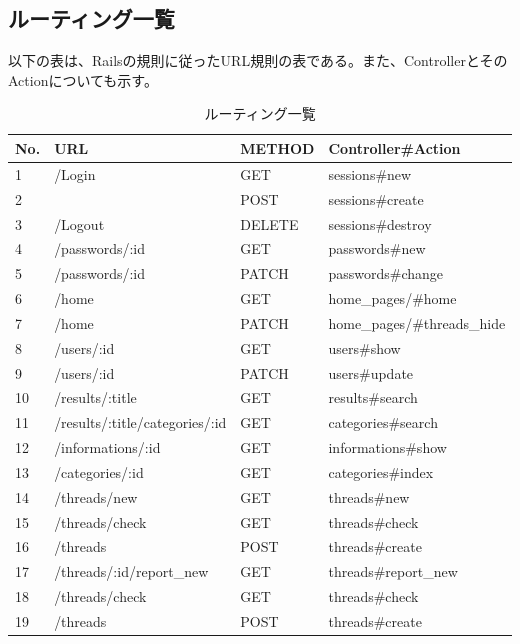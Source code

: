\documentclass[a4j]{jarticle}
\begin{document}
\subsection{ルーティング一覧}
以下の表は、Railsの規則に従ったURL規則の表である。また、ControllerとそのActionについても示す。



\begin{table}[htb]
  \caption{ルーティング一覧}
  \centering
  \begin{tabular}{|l|l|l||l|} \hline
    No.&   URL 						&METHOD & Controller\#Action \\ \hline \hline
	 1&	/Login  					 	& GET      & sessions\#new       \\
       2&  ~			         			& POST    & sessions\#create	\\
	 3&	/Logout   				      &DELETE   &sessions\#destroy	\\
	 4&	/passwords/:id					&GET	  &passwords\#new    \\
	 5 & /passwords/:id					&PATCH	  &passwords\#change \\
	 6&	/home   						& GET 	   &home\_pages/\#home    \\
       7&	/home   						& PATCH 	   &home\_pages/\#threads\_hide \\
	 8&	/users/:id     					&  GET  	    &  users\#show       \\
	 9&	/users/:id     					 & PATCH   &  users\#update       \\
	10&	/results/:title         			& GET   	    & results\#search      \\
	11& /results/:title/categories/:id		&GET		& categories\#search	\\
	12&	/informations/:id				  & GET       & informations\#show      \\
	13&	/categories/:id    		   		 &   GET      & categories\#index    \\
	14&	/threads/new      	 	  		 &  GET      &  threads\#new         \\
	15&/threads/check      		       &  GET      & threads\#check       \\
	16&/threads                   		       &  POST    &threads\#create      \\
	17&/threads/:id/report\_new   		&   GET      &threads\#report\_new  \\
	18&	/threads/check               		&   GET      & threads\#check       \\
	19&	/threads                      		 & POST     & threads\#create     \\

\end{tabular}
\end{table}
\end{document}
